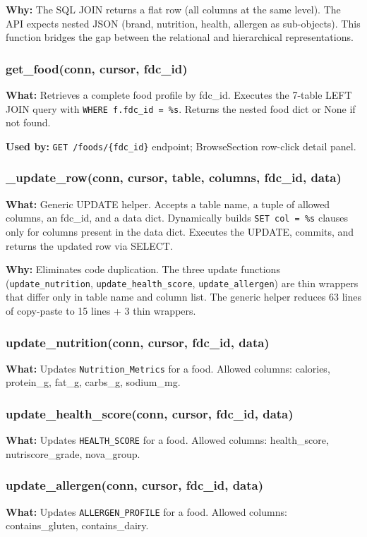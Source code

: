 \documentclass[12pt,a4paper]{article}
\begin{document}
\textbf{Why:} The SQL JOIN returns a flat row (all columns at the same level). The API expects nested JSON (brand, nutrition, health, allergen as sub-objects). This function bridges the gap between the relational and hierarchical representations.

\subsubsection{get\_food(conn, cursor, fdc\_id)}
\textbf{What:} Retrieves a complete food profile by fdc\_id. Executes the 7-table LEFT JOIN query with \texttt{WHERE f.fdc\_id = \%s}. Returns the nested food dict or None if not found.

\textbf{Used by:} \texttt{GET /foods/\{fdc\_id\}} endpoint; BrowseSection row-click detail panel.

\subsubsection{\_update\_row(conn, cursor, table, columns, fdc\_id, data)}
\textbf{What:} Generic UPDATE helper. Accepts a table name, a tuple of allowed columns, an fdc\_id, and a data dict. Dynamically builds \texttt{SET col = \%s} clauses only for columns present in the data dict. Executes the UPDATE, commits, and returns the updated row via SELECT.

\textbf{Why:} Eliminates code duplication. The three update functions (\texttt{update\_nutrition}, \texttt{update\_health\_score}, \texttt{update\_allergen}) are thin wrappers that differ only in table name and column list. The generic helper reduces 63 lines of copy-paste to 15 lines + 3 thin wrappers.

\subsubsection{update\_nutrition(conn, cursor, fdc\_id, data)}
\textbf{What:} Updates \texttt{Nutrition\_Metrics} for a food. Allowed columns: calories, protein\_g, fat\_g, carbs\_g, sodium\_mg.

\subsubsection{update\_health\_score(conn, cursor, fdc\_id, data)}
\textbf{What:} Updates \texttt{HEALTH\_SCORE} for a food. Allowed columns: health\_score, nutriscore\_grade, nova\_group.

\subsubsection{update\_allergen(conn, cursor, fdc\_id, data)}
\textbf{What:} Updates \texttt{ALLERGEN\_PROFILE} for a food. Allowed columns: contains\_gluten, contains\_dairy.
\end{document}
